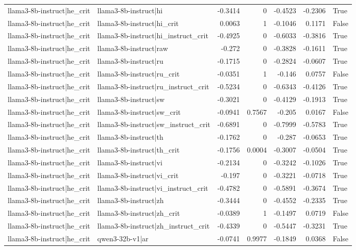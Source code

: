 \begin{table}
\begin{tabular}{l l r r r r l}
llama3-8b-instruct|he_crit & llama3-8b-instruct|hi & -0.3414 & 0 & -0.4523 & -0.2306 & True \\
llama3-8b-instruct|he_crit & llama3-8b-instruct|hi_crit & 0.0063 & 1 & -0.1046 & 0.1171 & False \\
llama3-8b-instruct|he_crit & llama3-8b-instruct|hi_instruct_crit & -0.4925 & 0 & -0.6033 & -0.3816 & True \\
llama3-8b-instruct|he_crit & llama3-8b-instruct|raw & -0.272 & 0 & -0.3828 & -0.1611 & True \\
llama3-8b-instruct|he_crit & llama3-8b-instruct|ru & -0.1715 & 0 & -0.2824 & -0.0607 & True \\
llama3-8b-instruct|he_crit & llama3-8b-instruct|ru_crit & -0.0351 & 1 & -0.146 & 0.0757 & False \\
llama3-8b-instruct|he_crit & llama3-8b-instruct|ru_instruct_crit & -0.5234 & 0 & -0.6343 & -0.4126 & True \\
llama3-8b-instruct|he_crit & llama3-8b-instruct|sw & -0.3021 & 0 & -0.4129 & -0.1913 & True \\
llama3-8b-instruct|he_crit & llama3-8b-instruct|sw_crit & -0.0941 & 0.7567 & -0.205 & 0.0167 & False \\
llama3-8b-instruct|he_crit & llama3-8b-instruct|sw_instruct_crit & -0.6891 & 0 & -0.7999 & -0.5783 & True \\
llama3-8b-instruct|he_crit & llama3-8b-instruct|th & -0.1762 & 0 & -0.287 & -0.0653 & True \\
llama3-8b-instruct|he_crit & llama3-8b-instruct|th_crit & -0.1756 & 0.0004 & -0.3007 & -0.0504 & True \\
llama3-8b-instruct|he_crit & llama3-8b-instruct|vi & -0.2134 & 0 & -0.3242 & -0.1026 & True \\
llama3-8b-instruct|he_crit & llama3-8b-instruct|vi_crit & -0.197 & 0 & -0.3221 & -0.0718 & True \\
llama3-8b-instruct|he_crit & llama3-8b-instruct|vi_instruct_crit & -0.4782 & 0 & -0.5891 & -0.3674 & True \\
llama3-8b-instruct|he_crit & llama3-8b-instruct|zh & -0.3444 & 0 & -0.4552 & -0.2335 & True \\
llama3-8b-instruct|he_crit & llama3-8b-instruct|zh_crit & -0.0389 & 1 & -0.1497 & 0.0719 & False \\
llama3-8b-instruct|he_crit & llama3-8b-instruct|zh_instruct_crit & -0.4339 & 0 & -0.5447 & -0.3231 & True \\
llama3-8b-instruct|he_crit & qwen3-32b-v1|ar & -0.0741 & 0.9977 & -0.1849 & 0.0368 & False \\

\end{tabular}
\end{table}

